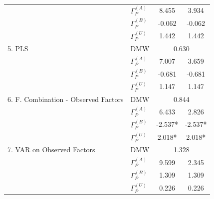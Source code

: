 \documentclass[11pt]{article}
\renewcommand{\baselinestretch}{1.5}
\begin{document}
\begin{table}
\begin{tabular}{|l|l|c|c|}
& $\Gamma_P^{(A)}$&8.455&3.934\\                                       
& $\Gamma_P^{(B)}$&-0.062&-0.062\\                                     
& $\Gamma_P^{(U)}$&1.442&1.442\\                                       
\hline                                                                 
5. PLS                              & DMW&\multicolumn{2}{|c|}{0.630}\\
\hline                                                                 
& $\Gamma_P^{(A)}$&7.007&3.659\\                                       
& $\Gamma_P^{(B)}$&-0.681&-0.681\\                                     
& $\Gamma_P^{(U)}$&1.147&1.147\\                                       
\hline                                                                 
6. F. Combination - Observed Factors& DMW&\multicolumn{2}{|c|}{0.844}\\
\hline                                                                 
& $\Gamma_P^{(A)}$&6.433&2.826\\                                       
& $\Gamma_P^{(B)}$&-2.537*&-2.537*\\                                   
& $\Gamma_P^{(U)}$&2.018*&2.018*\\                                     
\hline                                                                 
7. VAR on Observed Factors          & DMW&\multicolumn{2}{|c|}{1.328}\\
\hline                                                                 
& $\Gamma_P^{(A)}$&9.599&2.345\\                                       
& $\Gamma_P^{(B)}$&1.309&1.309\\                                       
& $\Gamma_P^{(U)}$&0.226&0.226\\                                       
\hline                                                                 
\end{tabular} 

\footnotesize \flushleft {}                                                        
\end{table}                                                            

\clearpage
\renewcommand{\baselinestretch}{1.5} \normalsize 
\end{document}
